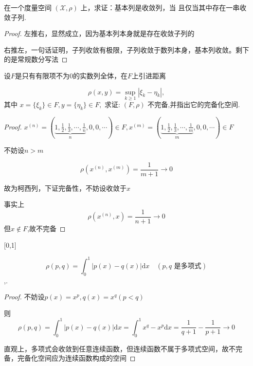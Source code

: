 \documentclass[lang=cn,10pt]{elegantbook}
\begin{document}
	\begin{exercise}
		在一个度量空间 $(\mathscr{X},\rho)$ 上，求证：基本列是收敛列，当
		且仅当其中存在一串收敛子列.
	\end{exercise}
	\begin{proof}
		左推右，显然成立，因为基本列本身就是存在收敛子列的
		
		右推左，一句话证明，子列收敛有极限，子列收敛于数列本身，基本列收敛。剩下的是常规数分写法
	\end{proof}
	\begin{exercise}
		 设$F$是只有有限项不为0的实数列全体，在$F$上引进距离
		 
		 \begin{equation*}
		 	\rho(x,y)=\sup_{k\geqslant1}|\xi_k-\eta_k|,
		 \end{equation*}		 
		 $\text{其中 }x=\{\xi_k\}\in F,y=\{\eta_k\}\in F,\text{ 求证: }(F,\rho)\text{ 不完备,并指出它}\text{的完备化空间.}$
	\end{exercise}
	\begin{proof}
		$x^{(n)}=\left(\underbrace{1,\frac{1}{2},\frac{1}{3},\cdots,\frac{1}{n}}_{n},0,0,\cdots\right)\in F,x^{(m)}=\left(\underbrace{1,\frac{1}{2},\frac{1}{3},\cdots,\frac{1}{m}}_{m},0,0,\cdots\right)\in F$
		
		不妨设$n>m$
		
		\begin{equation*}
			\rho(x^{(n)},x^{(m)})=\frac{1}{m+1}\rightarrow0
		\end{equation*}
		
		故为柯西列，下证完备性，不妨设收敛于$x$
		
		事实上
		\begin{equation*}
			\rho(x^{(n)},x)=\frac{1}{n+1}\rightarrow0
		\end{equation*}
		但$x$$\notin F$,故不完备
	\end{proof}
	\begin{exercise}
		[0,1]
		
		\begin{equation*}
			\rho(p,q)=\int_0^1\lvert p(x)-q(x)\rvert\mathrm{d}x\quad(p,q\text{ 是多项式})
		\end{equation*}
		,.
	\end{exercise}
	\begin{proof}
		不妨设$p(x)=x^{p},q(x)=x^q(p<q)$
		
		则
		\begin{equation*}
			\rho (p,q)=\int_0^1{\left| p(x)-q(x) \right|}\mathrm{d}x=\int_0^1{x^q-x^p}\mathrm{d}x=\frac{1}{q+1}-\frac{1}{p+1}\rightarrow 0
		\end{equation*}
		
		直观上，多项式会收敛到任意连续函数，但连续函数不属于多项式空间，故不完备，完备化空间应为连续函数构成的空间
	\end{proof}
\end{document}
